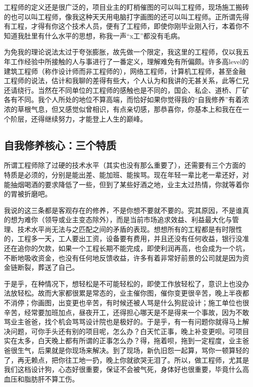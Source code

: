 \documentclass[
]{book}
\begin{document}
工程师的定义还是很广泛的，项目业主的盯梢催图的可以叫工程师，现场施工搬砖的也可以叫工程师，像我这种天天用电脑打字画图的还可以叫工程师。正所谓先得有工程，才得有你这个技术人员，便有了工程师，即使你刚毕业刚入行，本着你不知道我肚里有什么水平的思想，称我一声``x工''都没有毛病。

为免我的理论说法太过于夸张膨胀，故先做一个限定，我这里的工程师，仅以我五年工作经验中所接触的人与事进行了一番定义，理解难免有所偏颇。许多高level的建筑工程师（称作设计师而非工程师的），网络工程师，计算机工程师，甚至金融工程师的说法，估计和我聊的差得有些大，个人认为和我讲的无甚关系，此等仁兄还请绕行。当然在不同单位的工程师的感触也是不同的，国企、私企、道桥、厂矿各有不同。我个人所处的地位不算高端，而恰好如果你觉得我的``自我修养''有着浓浓的草根气息，但又感觉似曾相识，有点亲切感，那恭喜你，你基本上和我在在一个阶层，还得继续努力，才能登上人生的巅峰。

\hypertarget{ux81eaux6211ux4feeux517bux6838ux5fc3ux4e09ux4e2aux7279ux8d28}{%
\subsection{自我修养核心：三个特质}\label{ux81eaux6211ux4feeux517bux6838ux5fc3ux4e09ux4e2aux7279ux8d28}}

所谓工程师除了过硬的技术水平（其实也没有那么重要了），还需要有三个方面的特质是必须的，分别是能出差、能加班、能挨骂。现在年轻一辈比老一辈还好，对能抽烟喝酒的要求降低了一些，但到了某些好酒之地，业主太过热情，你就等着你的胃被折磨吧。

我说的这三条都是客观存在的修养，不是你想不要就不要的。究其原因，不是谁真的想为难你（领导或业主变态除外），而是当前市场追求效益、利益最大化与管理、技术水平尚无法与之匹配之间的矛盾的表现。想想所有的工程都是有时限性的，工程多一天，工人要出工资，设备要有费用，并且还没有任何收益，银行没准还在追你的欠款，如果一个工程长期不能完成，即使利润再高，也会成为一个坑，不断地吸收资金，也没有任何地反馈收益，许多有着非常好前景的公司就是因为资金链断裂，葬送了自己。

于是乎，在种情况下，想轻松是不可能轻松的，即使工作放轻松了，意识上也没办法放轻松。故而大家都很累是常态的，业主催你图，催你变更很辛苦，晚上半夜都不消停；你画图，出变更也辛苦，有时候还被人骂是什么狗屁设计；施工单位也很辛苦，经常要加班加点，昼夜开工，还得担心哪天是不是得来一个事故，因为不敢骂业主爸爸，找个机会骂骂设计院也是极好的。于是乎，有一有问题你就得马上解决问题，可你手头还有别的项目呢，怎么办？白天忙正事，晚上补变更呗。可项目实在太多，白天晚上都有所谓的正事怎么办？得，拖着呗，拖到一定程度，业主爸爸很生气，后果就是你现场来解决。到了现场，新仇旧怨一起算，骂你一顿算轻的了，再无赖点，把你往工地一扔，晚上你就欲哭无泪了。所以，做工程师，尤其是我们这档设计狗，心态好很重要，保证不会被气死，身体好也很重要，毕竟什么高血压和脂肪肝不算工伤。
\end{document}
